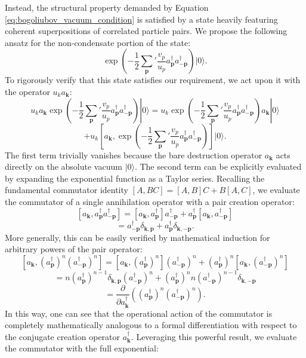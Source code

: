 Instead, the structural property demanded by Equation \ref{eq:bogoliubov_vacuum_condition} is satisfied by a state heavily featuring coherent superpositions of correlated particle pairs. We propose the following ansatz for the non-condensate portion of the state:
\[
    \exp\left( -\frac{1}{2} \sum_{\mathbf{p}}' \frac{v_p}{u_p} a_{\mathbf{p}}^\dagger a_{-\mathbf{p}}^\dagger \right) |0\rangle.
\]
To rigorously verify that this state satisfies our requirement, we act upon it with the operator \( u_k a_{\mathbf{k}} \):
\[
    u_k a_{\mathbf{k}} \exp\left( -\frac{1}{2} \sum_{\mathbf{p}}' \frac{v_p}{u_p} a_{\mathbf{p}}^\dagger a_{-\mathbf{p}}^\dagger \right) |0\rangle = u_k \exp\left( -\frac{1}{2} \sum_{\mathbf{p}}' \frac{v_p}{u_p} a_{\mathbf{p}}^\dagger a_{-\mathbf{p}}^\dagger \right) a_{\mathbf{k}} |0\rangle
\]
\[
    + u_k \left[ a_{\mathbf{k}}, \exp\left( -\frac{1}{2} \sum_{\mathbf{p}}' \frac{v_p}{u_p} a_{\mathbf{p}}^\dagger a_{-\mathbf{p}}^\dagger \right) \right] |0\rangle.
\]
The first term trivially vanishes because the bare destruction operator \( a_{\mathbf{k}} \) acts directly on the absolute vacuum \( |0\rangle \). The second term can be explicitly evaluated by expanding the exponential function as a Taylor series. Recalling the fundamental commutator identity \( [A, BC] = [A, B]C + B[A, C] \), we evaluate the commutator of a single annihilation operator with a pair creation operator:
\[
    [a_{\mathbf{k}}, a_{\mathbf{p}}^\dagger a_{-\mathbf{p}}^\dagger] = [a_{\mathbf{k}}, a_{\mathbf{p}}^\dagger] a_{-\mathbf{p}}^\dagger + a_{\mathbf{p}}^\dagger [a_{\mathbf{k}}, a_{-\mathbf{p}}^\dagger]
\]
\[
    = a_{-\mathbf{p}}^\dagger \delta_{\mathbf{k}, \mathbf{p}} + a_{\mathbf{p}}^\dagger \delta_{\mathbf{k}, -\mathbf{p}}.
\]
More generally, this can be easily verified by mathematical induction for arbitrary powers of the pair operator:
\[
    [a_{\mathbf{k}}, (a_{\mathbf{p}}^\dagger)^n (a_{-\mathbf{p}}^\dagger)^n] = [a_{\mathbf{k}}, (a_{\mathbf{p}}^\dagger)^n] (a_{-\mathbf{p}}^\dagger)^n + (a_{\mathbf{p}}^\dagger)^n [a_{\mathbf{k}}, (a_{-\mathbf{p}}^\dagger)^n]
\]
\[
    = n(a_{\mathbf{p}}^\dagger)^{n-1} \delta_{\mathbf{k}, \mathbf{p}} (a_{-\mathbf{p}}^\dagger)^n + (a_{\mathbf{p}}^\dagger)^n n(a_{-\mathbf{p}}^\dagger)^{n-1} \delta_{\mathbf{k}, -\mathbf{p}}
\]
\[
    = \frac{\partial}{\partial a_{\mathbf{k}}^\dagger} \left( (a_{\mathbf{p}}^\dagger)^n (a_{-\mathbf{p}}^\dagger)^n \right).
\]
In this way, one can see that the operational action of the commutator is completely mathematically analogous to a formal differentiation with respect to the conjugate creation operator \( a_{\mathbf{k}}^\dagger \). Leveraging this powerful result, we evaluate the commutator with the full exponential:
